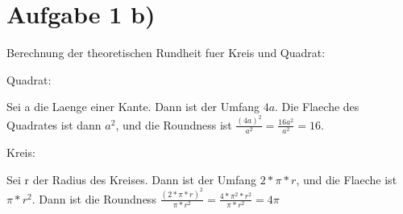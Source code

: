 



\section{Aufgabe 1 b)}

Berechnung der theoretischen Rundheit fuer Kreis und Quadrat: 

Quadrat:

Sei a die Laenge einer Kante. Dann ist der Umfang $4a$. 
Die Flaeche des Quadrates ist dann $a^2$, und die Roundness ist
$\frac{(4a)^2}{a^2} = \frac{16a^2}{a^2} = 16$. 

Kreis:

Sei r der Radius des Kreises. Dann ist der Umfang $2*\pi *r$, und
die Flaeche ist $\pi * r^2$. Dann ist die Roundness
$ \frac{(2*\pi *r)^2}{\pi * r^2} = \frac { 4* \pi^2 * r^2}{\pi * r^2} 
= 4\pi $



